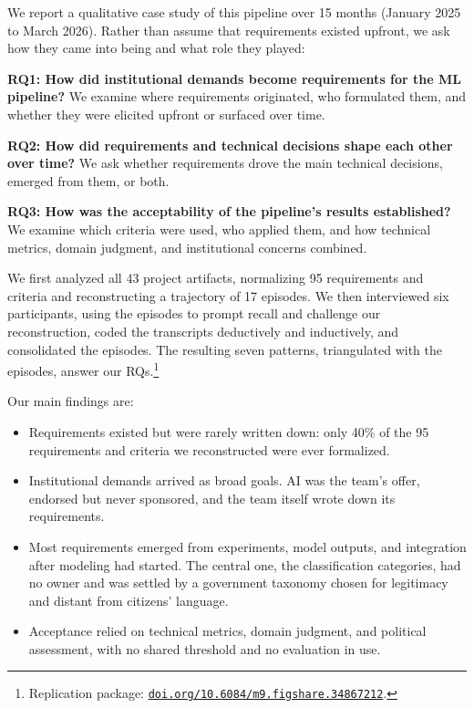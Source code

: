 \documentclass[sigconf,nonacm]{acmart}
\begin{document}
We report a qualitative case study of this pipeline over 15 months (January 2025 to March 2026). Rather than assume that requirements existed upfront, we ask how they came into being and what role they played:

\smallskip
\noindent\textbf{RQ1: How did institutional demands become requirements for the ML pipeline?} We examine where requirements originated, who formulated them, and whether they were elicited upfront or surfaced over time.

\smallskip
\noindent\textbf{RQ2: How did requirements and technical decisions shape each other over time?} We ask whether requirements drove the main technical decisions, emerged from them, or both.

\smallskip
\noindent\textbf{RQ3: How was the acceptability of the pipeline's results established?} We examine which criteria were used, who applied them, and how technical metrics, domain judgment, and institutional concerns combined.

\smallskip
We first analyzed all 43 project artifacts, normalizing 95 requirements and criteria and reconstructing a trajectory of 17 episodes. We then interviewed six participants, using the episodes to prompt recall and challenge our reconstruction, coded the transcripts deductively and inductively, and consolidated the episodes. The resulting seven patterns, triangulated with the episodes, answer our RQs.\footnote{Replication package: \href{https://doi.org/10.6084/m9.figshare.34867212}{\nolinkurl{doi.org/10.6084/m9.figshare.34867212}}.}

Our main findings are:

\begin{itemize}
\item Requirements existed but were rarely written down: only 40\% of the 95 requirements and criteria we reconstructed were ever formalized.
\item Institutional demands arrived as broad goals. AI was the team's offer, endorsed but never sponsored, and the team itself wrote down its requirements.
\item Most requirements emerged from experiments, model outputs, and integration after modeling had started. The central one, the classification categories, had no owner and was settled by a government taxonomy chosen for legitimacy and distant from citizens' language.
\item Acceptance relied on technical metrics, domain judgment, and political assessment, with no shared threshold and no evaluation in use.
\end{itemize}
\end{document}
